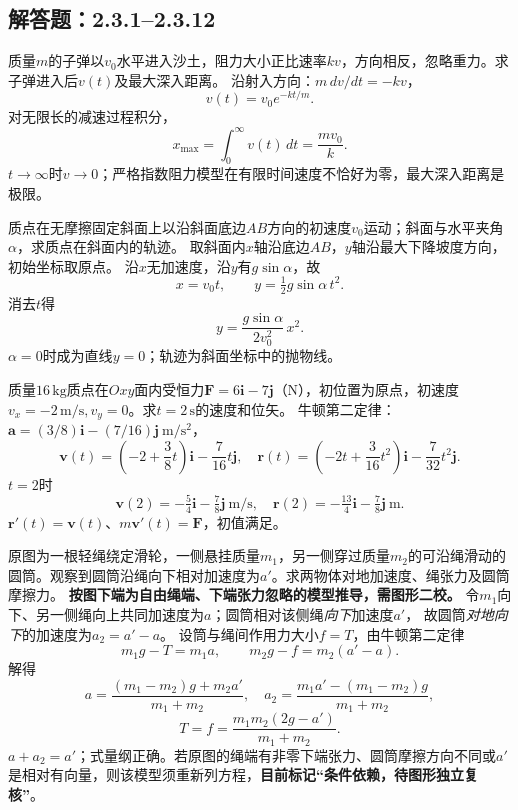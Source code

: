 
\subsection{解答题：2.3.1--2.3.12}

\problemtext 质量$m$的子弹以$v_0$水平进入沙土，阻力大小正比速率$kv$，方向相反，忽略重力。求子弹进入后$v(t)$及最大深入距离。
\workings
沿射入方向：$m\,dv/dt=-kv$，
\[
\boxed{v(t)=v_0e^{-kt/m}}.
\]
对无限长的减速过程积分，
\[
\boxed{x_{\max}=\int_0^\infty v(t)\,dt=\frac{mv_0}{k}}.
\]
\crosscheck $t\to\infty$时$v\to0$；严格指数阻力模型在有限时间速度不恰好为零，最大深入距离是极限。

\problemtext 质点在无摩擦固定斜面上以沿斜面底边$AB$方向的初速度$v_0$运动；斜面与水平夹角$\alpha$，求质点在斜面内的轨迹。
\workings
取斜面内$x$轴沿底边$AB$，$y$轴沿最大下降坡度方向，初始坐标取原点。
沿$x$无加速度，沿$y$有$g\sin\alpha$，故
\[
x=v_0t,\qquad y=\tfrac12g\sin\alpha\,t^2.
\]
消去$t$得
\[
\boxed{y=\frac{g\sin\alpha}{2v_0^2}\,x^2}.
\]
\crosscheck $\alpha=0$时成为直线$y=0$；轨迹为斜面坐标中的抛物线。

\problemtext 质量$16\,\mathrm{kg}$质点在$Oxy$面内受恒力$\bm F=6\bm i-7\bm j$（N），初位置为原点，初速度$v_x=-2\,\mathrm{m/s},v_y=0$。求$t=2\,\mathrm s$的速度和位矢。
\workings
牛顿第二定律：
$\bm a=(3/8)\bm i-(7/16)\bm j\ \mathrm{m/s^2}$，
\[
\bm v(t)=\left(-2+\frac38t\right)\bm i-\frac7{16}t\bm j,
\quad
\bm r(t)=\left(-2t+\frac3{16}t^2\right)\bm i-\frac7{32}t^2\bm j.
\]
$t=2$时
\[
\boxed{\bm v(2)=-\tfrac54\bm i-\tfrac78\bm j\ \mathrm{m/s}},
\quad
\boxed{\bm r(2)=-\tfrac{13}{4}\bm i-\tfrac78\bm j\ \mathrm m}.
\]
\crosscheck $\bm r'(t)=\bm v(t)$、$m\bm v'(t)=\bm F$，初值满足。

\problemtext 原图为一根轻绳绕定滑轮，一侧悬挂质量$m_1$，另一侧穿过质量$m_2$的可沿绳滑动的圆筒。观察到圆筒沿绳向下相对加速度为$a'$。求两物体对地加速度、绳张力及圆筒摩擦力。
\workings
\textbf{按图下端为自由绳端、下端张力忽略的模型推导，需图形二校。}
令$m_1$向下、另一侧绳向上共同加速度为$a$；圆筒相对该侧绳\emph{向下}加速度$a'$，
故圆筒\emph{对地向下}的加速度为$a_2=a'-a$。
设筒与绳间作用力大小$f=T$，由牛顿第二定律
\[
m_1g-T=m_1a,\qquad m_2g-f=m_2(a'-a).
\]
解得
\[
\boxed{a=\frac{(m_1-m_2)g+m_2a'}{m_1+m_2}},\quad
\boxed{a_2=\frac{m_1a'-(m_1-m_2)g}{m_1+m_2}},
\]
\[
\boxed{T=f=\frac{m_1m_2(2g-a')}{m_1+m_2}}.
\]
\crosscheck $a+a_2=a'$；式量纲正确。若原图的绳端有非零下端张力、圆筒摩擦方向不同或$a'$是相对有向量，则该模型须重新列方程，\textbf{目前标记“条件依赖，待图形独立复核”}。

